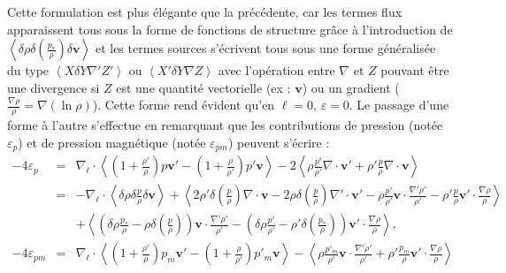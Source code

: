 Cette formulation  est plus élégante que la précédente, car les termes flux apparaissent tous sous la forme de fonctions de structure grâce à l'introduction de $\left<\delta \rho \delta \left(\frac{p_*}{\rho}\right) \delta \boldsymbol{v}\right>$ et les termes sources s'écrivent tous sous une forme généralisée du type $\left<X \delta Y \nabla' Z'\right>$ ou  $\left<X' \delta Y \nabla Z\right>$ avec l'opération entre $\nabla$ et $Z$ pouvant être une divergence si $Z$ est une quantité vectorielle (ex : $\boldsymbol{v}$) ou un gradient ($\frac{\nabla \rho}{\rho} = \nabla \left(\ln \rho\right)$). Cette forme rend évident qu'en $\boldsymbol{\ell} = 0$, $\varepsilon = 0$. Le passage d'une forme à l'autre s'effectue en remarquant que les contributions de pression (notée $\varepsilon_{p}$) et de pression magnétique (notée $\varepsilon_{pm}$) peuvent s'écrire : 
\begin{eqnarray}
\label{eq:turb_ref_p} -4\varepsilon_{p} &=&\nabla_{\boldsymbol{\ell}} \cdot \left<\left(1+\frac{\rho'}{\rho}\right) p \boldsymbol{v'} - \left(1+\frac{\rho}{\rho'}\right)p'\boldsymbol{v} \right>  -2\left<\rho  \frac{p'}{\rho'} \nabla \cdot \boldsymbol{v'} + \rho' \frac{p}{\rho} \nabla \cdot \boldsymbol{v}\right> \nonumber\\
&=& - \nabla_{\boldsymbol{\ell}} \cdot \left<\delta \rho  \delta \frac{p}{\rho} \delta \boldsymbol{v} \right>  +   \left<2  \rho' \delta \left(\frac{p}{\rho}\right) \nabla \cdot \boldsymbol{v} - 2  \rho \delta \left(\frac{p}{\rho}\right) \nabla' \cdot \boldsymbol{v'}-\rho \frac{p'}{\rho'} \boldsymbol{v} \cdot \frac{\nabla'\rho'}{\rho'} - \rho' \frac{p}{\rho} \boldsymbol{v'} \cdot \frac{\nabla\rho}{\rho} \right>\nonumber\\ 
&&+ \left<\left(\delta \rho \frac{p_*}{\rho} - \rho \delta \left(\frac{p}{\rho}\right)\right)\boldsymbol{v} \cdot \frac{\nabla' \rho'}{\rho'} - \left(\delta \rho \frac{p'}{\rho'} - \rho' \delta \left(\frac{p_*}{\rho}\right)\right)\boldsymbol{v'} \cdot \frac{\nabla \rho}{\rho}\right>, \\
\label{eq:turb_ref_pm}-4\varepsilon_{pm} &=&  \nabla_{\boldsymbol{\ell}} \cdot \left<\left(1+\frac{\rho'}{\rho}\right) p_m \boldsymbol{v'} - \left(1+\frac{\rho}{\rho'}\right)p'_m\boldsymbol{v} \right> - \left<\rho \frac{p'_m}{\rho'} \boldsymbol{v} \cdot \frac{\nabla'\rho'}{\rho'} + \rho' \frac{p_m}{\rho} \boldsymbol{v'} \cdot \frac{\nabla\rho}{\rho}\right> \nonumber\\

\end{eqnarray}
